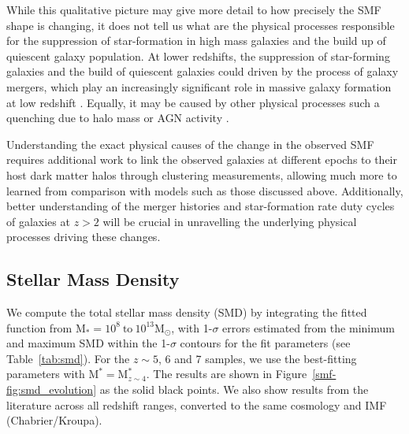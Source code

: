 While this qualitative picture may give more detail to how precisely the SMF shape is changing, it does not tell us what are the physical processes responsible for the suppression of star-formation in high mass galaxies and the build up of quiescent galaxy population. At lower redshifts, the suppression of star-forming galaxies and the build of quiescent galaxies could driven by the process of galaxy mergers, which play an increasingly significant role in massive galaxy formation at low redshift \citep{Ownsworth:2014gt}. Equally, it may be caused by other physical processes such a quenching due to halo mass \citep{Peng:2010gn} or AGN activity \citep{Henriques:2015gd}. 

Understanding the exact physical causes of the change in the observed SMF requires additional work to link the observed galaxies at different epochs to their host dark matter halos through clustering measurements, allowing much more to learned from comparison with models such as those discussed above. Additionally, better understanding of the merger histories and star-formation rate duty cycles of galaxies at $z > 2$ will be crucial in unravelling the underlying physical processes driving these changes.

\subsection{Stellar Mass Density}
We compute the total stellar mass density (SMD) by integrating the fitted \citet{Schechter:1976gl} function from $\text{M}_{*} = 10^8~\text{to}~10^{13} \text{M}_{\odot}$, with 1-$\sigma$ errors estimated from the minimum and maximum SMD within the 1-$\sigma$ contours for the fit parameters (see Table~\ref{tab:smd}). For the $z\sim 5$, 6 and 7 samples, we use the best-fitting parameters with $\text{M}^{*} = \text{M}_{z\sim4}^{*}$. The results are shown in Figure~\ref{smf-fig:smd_evolution} as the solid black points. We also show results from the literature across all redshift ranges, converted to the same cosmology and IMF (Chabrier/Kroupa).

